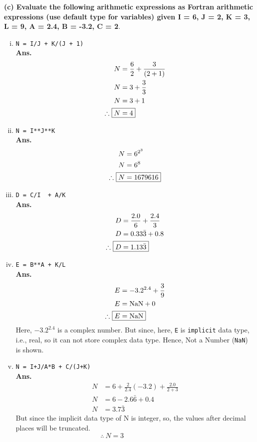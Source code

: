 \documentclass[11pt]{article} %
\begin{document}
\textbf{(c)  Evaluate the following arithmetic expressions as Fortran arithmetic expressions (use default type for variables) given I = 6, J = 2, K = 3, L = 9, A = 2.4, B = -3.2, C = 2}.
\begin{enumerate}[(i)]
    \item \lstinline{N = I/J + K/(J + 1)}\\
    \textbf{Ans.} 
    \begin{align*}
        N &= \frac{6}{2} + \frac{3}{(2+1)}  \\
        N &= 3 + \frac{3}{3}    \\
        N &= 3 + 1  \\
        \therefore~\Aboxed{N &= 4}
    \end{align*}
    \item \lstinline{N = I**J**K}\\
    \textbf{Ans.} 
    \begin{align*}
        N &= 6^{2^3}\\
        N &= 6^{8}\\
        \therefore~\Aboxed{N &= 1679616}
    \end{align*}
    \item \lstinline{D = C/I  + A/K}\\
    \textbf{Ans.} 
    \begin{align*}
        D &= \frac{2.0}{6} + \frac{2.4}{3}\\
        D &= 0.33\bar{3} + 0.8\\
        \therefore~\Aboxed{D & = 1.13\bar{3}}
    \end{align*}
    \item \lstinline{E = B**A + K/L}\\
    \textbf{Ans.} 
    \begin{align*}
        E &= -3.2^{2.4} + \frac{3}{9}\\
        E &= \text{\lstinline{NaN}} + 0\\
        \therefore~\Aboxed{E &= \text{\lstinline{NaN}}}
    \end{align*}
    Here, $-3.2^{2.4}$ is a complex number. But since, here, \lstinline{E} is \lstinline{implicit} data type, i.e., real, so it can not store complex data type. Hence, Not a Number (\lstinline{NaN}) is shown.
    \item \lstinline{N = I+J/A*B + C/(J+K)}\\
    \textbf{Ans.} 
    \begin{align*}
        N &= 6+ \frac{2}{2.4}(-3.2) + \frac{2.0}{2+3}\\
        N &= 6 - 2.6\bar{6} + 0.4\\
        N &= 3.7\bar{3}
    \end{align*}
    But since the implicit data type of N is integer, so, the values after decimal places will be truncated.
    \[ \therefore~\boxed{N = 3} ~~~~~~~~~~~~~~~~~~~~~~~~~~~~~~\]
\end{enumerate}
\end{document}

